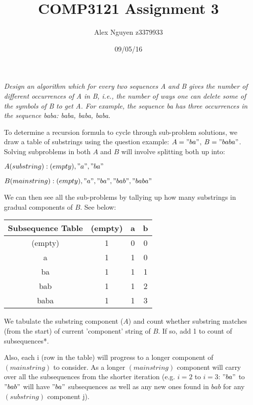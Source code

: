 \documentclass[11pt, a4paper]{article}
\title{COMP3121 Assignment 3}
\author{Alex Nguyen z3379933}
\date{09/05/16}
\begin{document}

\textit{Design an algorithm which for every two sequences A and B gives the number of different occurrences of A in B, i.e., the number of ways one can delete some of the symbols of B to get A. For example, the sequence ba has three occurrences in the sequence baba: baba, baba, baba.}

\vspace{2mm}
 To determine a recursion formula to cycle through sub-problem solutions, we draw a table of substrings using the question example: $A = "ba"$, $B = "baba"$.
 Solving subproblems in both $A$ and $B$ will involve splitting both up into:
  
 $A(substring): (empty), "a", "ba"$

 $B(main string): (empty), "a", "ba", "bab", "baba"$

 We can then see all the sub-problems by tallying up how many substrings in gradual components of $B$. See below:

  \vspace{5mm}

\begin{tabular}{ c | c | c | c }
  \hline			
  Subsequence Table & (empty) & a & b \\
  \hline			
  (empty) & 1 & 0 & 0\\
  a & 1 & 1 & 0 \\
  ba & 1 & 1 & 1\\
  bab & 1 & 1 & 2\\
  baba & 1 & 1 & 3\\
  \hline  
\end{tabular}

  \vspace{5mm}

 We tabulate the substring component ($A$) and count whether substring matches (from the start) of current 'component' string of $B$. If so, add 1 to count of subsequences*.

 Also, each i (row in the table) will progress to a longer component of $(main string)$ to consider. 
 As a longer $(main string)$ component will carry over all the subsequences from the shorter iteration (e.g. $i = 2$ to $i = 3$: $"ba"$ to $"bab"$ will have $"ba"$ subsequences as well as any new ones found in $bab$ for any $(substring)$ component j). 
\end{document}
